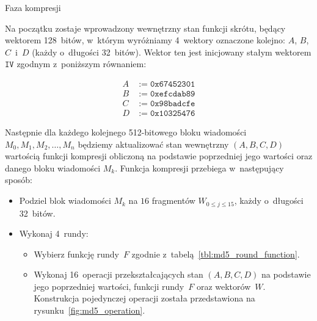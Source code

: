 \begin{myenumerate}
\begin{myenumerate}
\begin{itemize}
        \end{itemize}

    \end{myenumerate}

    \item Faza kompresji

    \begin{myenumerate}

        \item Na początku zostaje wprowadzony wewnętrzny stan funkcji skrótu,
        będący wektorem 128~bitów, w~którym wyróżniamy 4~wektory oznaczone
        kolejno: $A$, $B$, $C$~i~$D$ (każdy o~długości 32~bitów). Wektor ten
        jest inicjowany stałym wektorem $\mathtt{IV}$ zgodnym z~poniższym
        równaniem:

        \[
            \begin{aligned}
                A &:= \mathtt{0x67452301} \\
                B &:= \mathtt{0xefcdab89} \\
                C &:= \mathtt{0x98badcfe} \\
                D &:= \mathtt{0x10325476}
            \end{aligned}
        \]

        \item Następnie dla każdego kolejnego 512-bitowego bloku wiadomości
        \break $M_0, M_1, M_2, \ldots, M_n$ będziemy aktualizować stan
        wewnętrzny $(A,B,C,D)$ wartością funkcji kompresji obliczoną na
        podstawie poprzedniej jego wartości oraz danego bloku wiadomości $M_k$.
        Funkcja kompresji przebiega w~następujący sposób:

        \begin{itemize}

            \item Podziel blok wiadomości $M_k$ na $16$ fragmentów $W_{0 \leq j
            \leq 15}$, każdy o~długości 32~bitów.

            \pagebreak
            \item Wykonaj 4~rundy:

            \begin{itemize}

                \item Wybierz funkcję rundy~$F$ zgodnie
                z~tabelą~\ref{tbl:md5_round_function}.

                \item Wykonaj 16~operacji przekształcających stan $(A,B,C,D)$
                na podstawie jego poprzedniej wartości, funkcji rundy~$F$ oraz
                wektorów~$W$. Konstrukcja pojedynczej operacji została
                przedstawiona na rysunku~\ref{fig:md5_operation}.


\end{itemize}
\end{itemize}
\end{myenumerate}
\end{myenumerate}

